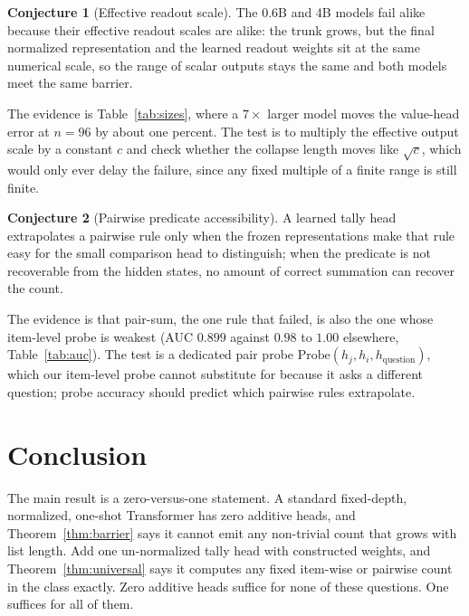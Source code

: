 \documentclass[10pt]{article}
\theoremstyle{definition}
\newtheorem{conjecture}{Conjecture}
\begin{document}
\begin{conjecture}[Effective readout scale]
\label{conj:readout}
The 0.6B and 4B models fail alike because their effective readout scales
are alike: the trunk grows, but the final normalized representation and
the learned readout weights sit at the same numerical scale, so the range
of scalar outputs stays the same and both models meet the same barrier.
\end{conjecture}

The evidence is Table~\ref{tab:sizes}, where a $7\times$ larger model
moves the value-head error at $n = 96$ by about one percent. The test is
to multiply the effective output scale by a constant $c$ and check whether
the collapse length moves like $\sqrt{c}$, which would only ever delay the
failure, since any fixed multiple of a finite range is still finite.

\begin{conjecture}[Pairwise predicate accessibility]
\label{conj:access}
A learned tally head extrapolates a pairwise rule only when the frozen
representations make that rule easy for the small comparison head to
distinguish; when the predicate is not recoverable from the hidden states,
no amount of correct summation can recover the count.
\end{conjecture}

The evidence is that pair-sum, the one rule that failed, is also the one
whose item-level probe is weakest (AUC $0.899$ against $0.98$ to $1.00$
elsewhere, Table~\ref{tab:auc}). The test is a dedicated pair probe
$\mathrm{Probe}(h_j, h_i, h_{\text{question}})$, which our item-level
probe cannot substitute for because it asks a different question; probe
accuracy should predict which pairwise rules extrapolate.

\section{Conclusion}
\label{sec:conclusion}

The main result is a zero-versus-one statement. A standard fixed-depth,
normalized, one-shot Transformer has zero additive heads, and Theorem~\ref{thm:barrier} says it cannot emit any non-trivial
count that grows with list length. Add one un-normalized tally head with
constructed weights, and Theorem~\ref{thm:universal} says it computes any
fixed item-wise or pairwise count in the class exactly. Zero additive
heads suffice for none of these questions. One suffices for all of them.
\end{document}
